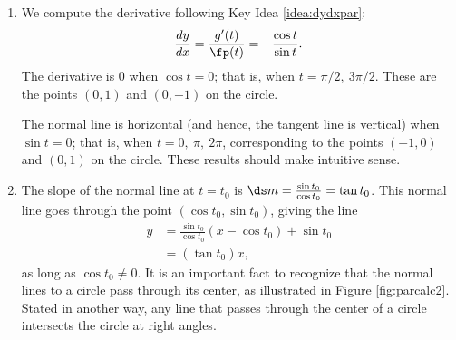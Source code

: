 		{\begin{enumerate}
			\item We compute the derivative following Key Idea \ref{idea:dydxpar}:
			$$\frac{dy}{dx} = \frac{g'(t)}{\fp(t)} = -\frac{\cos t}{\sin t}.$$
			The derivative is $0$ when $\cos t= 0$; that is, when $t=\pi/2,\ 3\pi/2$. These are the points $(0,1)$ and $(0,-1)$ on the circle.
			
			The normal line is horizontal (and hence, the tangent line is vertical) when $\sin t=0$; that is, when $t= 0,\ \pi,\ 2\pi$, corresponding to the points $(-1,0)$ and $(0,1)$ on the circle. These results should make intuitive sense.
			\item		The slope of the normal line at $t=t_0$ is $\ds m=\frac{\sin t_0}{\cos t_0} = \tan t_0$. This normal line goes through the point $(\cos t_0,\sin t_0)$, giving the line \begin{align*}y &=\frac{\sin t_0}{\cos t_0}(x-\cos t_0) + \sin t_0\\	
							&= (\tan t_0)x,
\end{align*}
as long as $\cos t_0\neq 0$. It is an important fact to recognize that the normal lines to a circle pass through its center, as illustrated in Figure \ref{fig:parcalc2}. Stated in another way, any line that passes through the center of a circle intersects the circle at right angles.
		\end{enumerate}
	\baselineskip
		}\\

\clearpage

